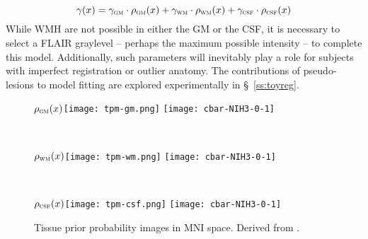\begin{equation}
\gamma(x) = \gamma_{\textsc{gm}}\cdot\rho_{\textsc{gm}}(x) + \gamma_{\textsc{wm}}\cdot\rho_{\textsc{wm}}(x) + \gamma_{\textsc{csf}}\cdot\rho_{\textsc{csf}}(x)
\end{equation}
While WMH are not possible in either the GM or the CSF, it is necessary to select a FLAIR graylevel -- perhaps the maximum possible intensity -- to complete this model.
Additionally, such parameters will inevitably play a role for subjects with imperfect registration or outlier anatomy.
The contributions of pseudo-lesions to model fitting are explored experimentally in \S\ \ref{ss:toyreg}.
\begin{figure}[h]
  \centering
  \begin{subfigureside}{$\rho_{\textsc{gm}}(x)$}\raggedleft\texttt{[image: tpm-gm.png]} \texttt{[image: cbar-NIH3-0-1]}\end{subfigureside}\\[0.5em]
  \begin{subfigureside}{$\rho_{\textsc{wm}}(x)$}\raggedleft\texttt{[image: tpm-wm.png]} \texttt{[image: cbar-NIH3-0-1]}\end{subfigureside}\\[0.5em]
  \begin{subfigureside}{$\rho_{\textsc{csf}}(x)$}\raggedleft\texttt{[image: tpm-csf.png]} \texttt{[image: cbar-NIH3-0-1]}\end{subfigureside}
  \caption{Tissue prior probability images in MNI space. Derived from \cite{Mazziotta2001}.}
  \label{fig:tpm-3}
\end{figure}

